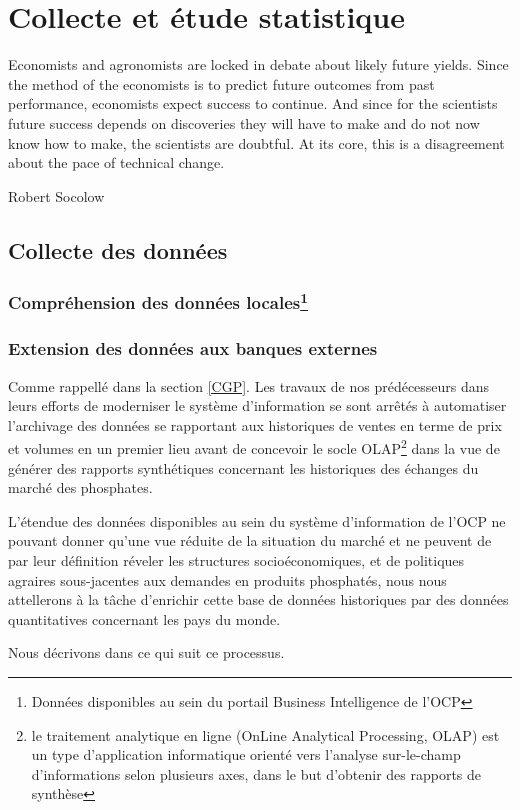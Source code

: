 \chapter{Collecte et étude statistique}
\epigraph{Economists and agronomists are locked in debate about likely
future yields. Since the method of the economists is to predict
future outcomes from past performance, economists expect
success to continue. And since for the scientists future success
depends on discoveries they will have to make and do not now
know how to make, the scientists are doubtful. At its core, this is
a disagreement about the pace of technical change.}{Robert
Socolow}	
\cleardoublepage

	\section{Collecte des données}
	\subsection{Compréhension des données locales\protect\footnote{Données disponibles au sein du portail Business Intelligence de l'OCP}}
	\subsection{Extension des données aux banques externes}
	Comme rappellé dans la section \ref{CGP}. Les travaux de nos prédécesseurs dans leurs efforts de moderniser le système d'information se sont arrêtés à automatiser l'archivage des données se rapportant aux historiques de ventes en terme de prix et volumes en un premier lieu\cite{CHEMLAL} avant de concevoir le socle OLAP\footnote{le traitement analytique en ligne (OnLine Analytical Processing, OLAP) est un type d'application informatique orienté vers l'analyse sur-le-champ d'informations selon plusieurs axes, dans le but d'obtenir des rapports de synthèse} dans la vue de générer des rapports synthétiques concernant les historiques des échanges du marché des phosphates.
	\par
	L'étendue des données disponibles au sein du système d'information de l'OCP ne pouvant donner qu'une vue réduite de la situation du marché et ne peuvent de par leur définition réveler les structures socioéconomiques,  et de politiques agraires sous-jacentes aux demandes en produits phosphatés, nous nous attellerons à la tâche d'enrichir cette base de données historiques par des données quantitatives concernant les pays du monde.
	\par
	Nous décrivons dans ce qui suit ce processus. 
